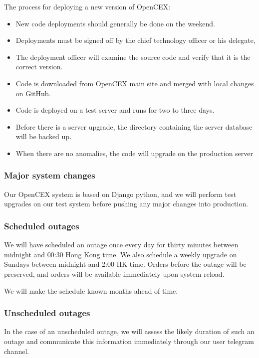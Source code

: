 The process for deploying a new version of OpenCEX:
\begin{itemize}
  \item New code deployments should generally be done on the weekend.
  \item Deployments must be signed off by the chief technology officer
    or his delegate,
  \item The deployment officer will examine the source code and verify
    that it is the correct version.
  \item Code is downloaded from OpenCEX main site and merged with
    local changes on GitHub.
  \item Code is deployed on a test server and runs for two to three days.
  \item Before there is a server upgrade, the directory containing the
    server database will be backed up.
  \item When there are no anomalies, the code will upgrade on the
    production server
\end{itemize}

\subsubsection{Major system changes}

Our OpenCEX system is based on Django python, and we will perform test
upgrades on our test system before pushing any major changes into
production.

\subsubsection{Scheduled outages}
We will have scheduled an outage once every day for thirty minutes
between midnight and 00:30 Hong Kong time.  We also schedule a weekly
upgrade on Sundays between midnight and 2:00 HK time.  Orders before
the outage will be preserved, and orders will be available immediately
upon system reload.

We will make the schedule known months ahead of time.

\subsubsection{Unscheduled outages}
In the case of an unscheduled outage, we will assess the likely duration of
such an outage and communicate this information immediately through
our user telegram channel.


